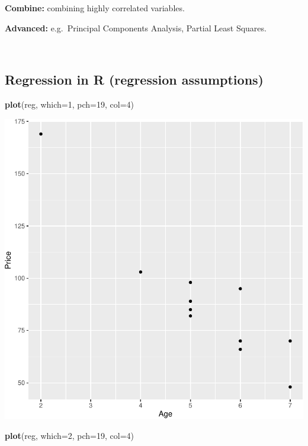 \documentclass[
]{article}
\newenvironment{Shaded}{\begin{snugshade}}{\end{snugshade}}
\newcommand{\AttributeTok}[1]{\textcolor[rgb]{0.13,0.29,0.53}{#1}}
\newcommand{\DecValTok}[1]{\textcolor[rgb]{0.00,0.00,0.81}{#1}}
\newcommand{\FunctionTok}[1]{\textcolor[rgb]{0.13,0.29,0.53}{\textbf{#1}}}
\newcommand{\NormalTok}[1]{#1}
\begin{document}
\textbf{Combine:} combining highly correlated variables.

\textbf{Advanced:} e.g.~Principal Components Analysis, Partial Least
Squares.

\(~\)

\hypertarget{regression-in-r-regression-assumptions}{%
\subsection{Regression in R (regression
assumptions)}\label{regression-in-r-regression-assumptions}}

\begin{Shaded}
\begin{Highlighting}[]
\FunctionTok{plot}\NormalTok{(reg, }\AttributeTok{which=}\DecValTok{1}\NormalTok{, }\AttributeTok{pch=}\DecValTok{19}\NormalTok{, }\AttributeTok{col=}\DecValTok{4}\NormalTok{)}
\end{Highlighting}
\end{Shaded}

\includegraphics{unnamed-chunk-82-1.pdf}

\begin{Shaded}
\begin{Highlighting}[]
\FunctionTok{plot}\NormalTok{(reg, }\AttributeTok{which=}\DecValTok{2}\NormalTok{, }\AttributeTok{pch=}\DecValTok{19}\NormalTok{, }\AttributeTok{col=}\DecValTok{4}\NormalTok{)}
\end{Highlighting}
\end{Shaded}
\end{document}
